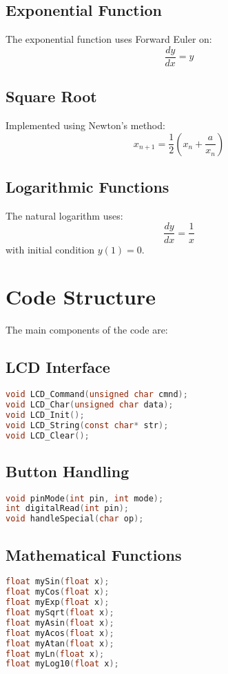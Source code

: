 \documentclass{article}
\begin{document}
\subsection{Exponential Function}
The exponential function uses Forward Euler on:
\[ \frac{dy}{dx} = y \]

\subsection{Square Root}
Implemented using Newton's method:
\[ x_{n+1} = \frac{1}{2}\left(x_n + \frac{a}{x_n}\right) \]

\subsection{Logarithmic Functions}
The natural logarithm uses:
\[ \frac{dy}{dx} = \frac{1}{x} \]
with initial condition \( y(1) = 0 \).

\section{Code Structure}
The main components of the code are:

\subsection{LCD Interface}
\begin{lstlisting}[language=C]
void LCD_Command(unsigned char cmnd);
void LCD_Char(unsigned char data);
void LCD_Init();
void LCD_String(const char* str);
void LCD_Clear();
\end{lstlisting}

\subsection{Button Handling}
\begin{lstlisting}[language=C]
void pinMode(int pin, int mode);
int digitalRead(int pin);
void handleSpecial(char op);
\end{lstlisting}

\subsection{Mathematical Functions}
\begin{lstlisting}[language=C]
float mySin(float x);
float myCos(float x);
float myExp(float x);
float mySqrt(float x);
float myAsin(float x);
float myAcos(float x);
float myAtan(float x);
float myLn(float x);
float myLog10(float x);
\end{lstlisting}
\end{document}
